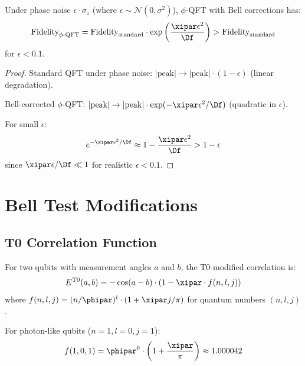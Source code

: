 \begin{corollary}
	\label{cor:stability}
	Under phase noise $\epsilon \cdot \sigma_z$ (where $\epsilon \sim \mathcal{N}(0, \sigma^2)$), $\phi$-QFT with Bell corrections has:
	\begin{equation}
		\text{Fidelity}_{\text{$\phi$-QFT}} = \text{Fidelity}_{\text{standard}} \cdot \exp\left(\frac{\xipar \epsilon^2}{\Df}\right) > \text{Fidelity}_{\text{standard}}
	\end{equation}
	for $\epsilon < 0.1$.
\end{corollary}

\begin{proof}
	Standard QFT under phase noise: $|\text{peak}| \to |\text{peak}| \cdot (1 - \epsilon)$ (linear degradation).
	
	Bell-corrected $\phi$-QFT: $|\text{peak}| \to |\text{peak}| \cdot \exp(-\xipar\epsilon^2/\Df)$ (quadratic in $\epsilon$).
	
	For small $\epsilon$:
	\begin{equation}
		e^{-\xipar\epsilon^2/\Df} \approx 1 - \frac{\xipar\epsilon^2}{\Df} > 1 - \epsilon
	\end{equation}
	since $\xipar\epsilon/\Df \ll 1$ for realistic $\epsilon < 0.1$.
\end{proof}

\section{Bell Test Modifications}
\label{sec:bell}

\subsection{T0 Correlation Function}

\begin{definition}
	For two qubits with measurement angles $a$ and $b$, the T0-modified correlation is:
	\begin{equation}
		E^{\text{T0}}(a,b) = -\cos(a-b) \cdot \left(1 - \xipar \cdot f(n,l,j)\right)
		\label{eq:t0bell}
	\end{equation}
	where $f(n,l,j) = (n/\phipar)^l \cdot (1 + \xipar j/\pi)$ for quantum numbers $(n,l,j)$.
\end{definition}

For photon-like qubits ($n=1, l=0, j=1$):
\begin{equation}
	f(1,0,1) = \phipar^0 \cdot \left(1 + \frac{\xipar}{\pi}\right) \approx 1.000042
\end{equation}


